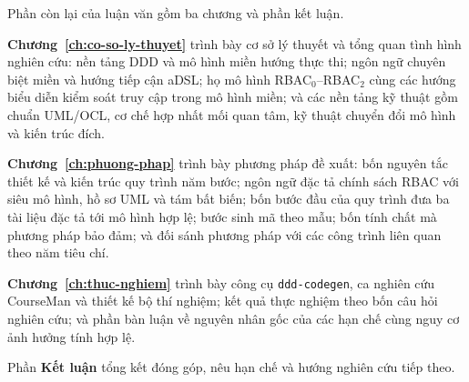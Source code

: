 Phần còn lại của luận văn gồm ba chương và phần kết luận.

\textbf{Chương~\ref{ch:co-so-ly-thuyet}} trình bày cơ sở lý thuyết và tổng quan tình hình nghiên cứu: nền tảng DDD và mô hình miền hướng thực thi; ngôn ngữ chuyên biệt miền và hướng tiếp cận aDSL; họ mô hình RBAC$_0$--RBAC$_2$ cùng các hướng biểu diễn kiểm soát truy cập trong mô hình miền; và các nền tảng kỹ thuật gồm chuẩn UML/OCL, cơ chế hợp nhất mối quan tâm, kỹ thuật chuyển đổi mô hình và kiến trúc đích.

\textbf{Chương~\ref{ch:phuong-phap}} trình bày phương pháp đề xuất: bốn nguyên tắc thiết kế và kiến trúc quy trình năm bước; ngôn ngữ đặc tả chính sách RBAC với siêu mô hình, hồ sơ UML và tám bất biến; bốn bước đầu của quy trình đưa ba tài liệu đặc tả tới mô hình hợp lệ; bước sinh mã theo mẫu; bốn tính chất mà phương pháp bảo đảm; và đối sánh phương pháp với các công trình liên quan theo năm tiêu chí.

\textbf{Chương~\ref{ch:thuc-nghiem}} trình bày công cụ \texttt{ddd-codegen}, ca nghiên cứu CourseMan và thiết kế bộ thí nghiệm; kết quả thực nghiệm theo bốn câu hỏi nghiên cứu; và phần bàn luận về nguyên nhân gốc của các hạn chế cùng nguy cơ ảnh hưởng tính hợp lệ.

Phần \textbf{Kết luận} tổng kết đóng góp, nêu hạn chế và hướng nghiên cứu tiếp theo.
